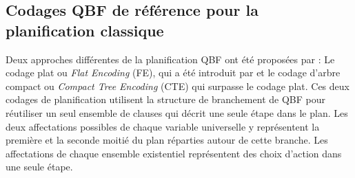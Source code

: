 









\subsection{Codages QBF de référence pour la planification classique}\label{chap:codages:qbf:reference}
%

Deux approches différentes de la planification QBF ont été proposées par \cite{DBLP:conf/ecai/CashmoreFG12}:
Le codage plat ou \textit{Flat Encoding} (FE), qui a été introduit par \cite{DBLP:conf/lpar/Rintanen01} et le codage d'arbre compact ou \textit{Compact Tree Encoding} (CTE)  %
\cite{DBLP:conf/ecai/CashmoreFG12} %
qui surpasse le codage plat.
Ces deux codages de planification utilisent la structure de branchement de QBF pour réutiliser un seul ensemble de clauses qui décrit une seule étape dans le plan. Les deux affectations possibles de chaque variable universelle y représentent la première et la seconde moitié du plan réparties autour de cette branche. Les affectations de chaque ensemble existentiel représentent des choix d'action dans une seule étape.

